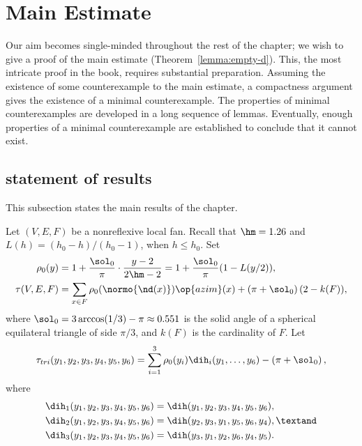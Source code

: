 \section{Main Estimate}\label{sec:weight}  

Our aim becomes single-minded throughout the rest of the chapter; we
wish to give a proof of the main estimate (Theorem~\ref{lemma:empty-d}).
This,  the most intricate proof in the book,  requires substantial
preparation.  Assuming the existence of some counterexample to the main estimate, a
compactness argument gives the existence of a minimal counterexample.
The properties of minimal counterexamples are developed in a long
sequence of lemmas.  Eventually, enough properties of a minimal
counterexample are established to conclude that it cannot exist.

\subsection{statement of results}\label{sec:statement}

This subsection states the main results of the chapter.


\begin{definition}\label{def:tau}
Let $(V,E,F)$ be a nonreflexive local fan.  Recall that $\hm = 1.26$ and
$L(h) = ({h_0-h})/({h_0-1})$, when $h \le h_0$.
  Set
\begin{align*}
\rho_0(y) &= 1 + \dfrac{\sol_0}{\pi} \cdot
    \dfrac{y-2}{2\hm-2} = 1 + \dfrac{\sol_0}{\pi}(1 - L(y/2)),\\
  \tau(V,E,F) &=\sum_{x\in F} \rho_0(\normo{\nd(x)})\op{azim}(x)
+ \left(\pi+{\sol_0}\right) (2- k(F)),
\end{align*}
where $\sol_0=3\arccos(1/3)-\pi\approx0.551$ is the solid angle of a
spherical equilateral triangle of side $\pi/3$, and $k(F)$ is the
cardinality of $F$.  
Let 
\begin{equation}\label{eqn:tautri}
  \tau_{tri}(y_1,y_2,y_3,y_4,y_5,y_6) =
  \sum_{i=1}^3 \rho_0(y_i) \dih_i(y_1,\ldots,y_6)
- \left(\pi+{\sol_0}\right),
\end{equation}
where
\begin{align}\label{eqn:dihi}
\dih_1(y_1,y_2,y_3,y_4,y_5,y_6) &= \dih(y_1,y_2,y_3,y_4,y_5,y_6),\notag\\
\dih_2(y_1,y_2,y_3,y_4,y_5,y_6) &= \dih(y_2,y_3,y_1,y_5,y_6,y_4),\textand\notag \\
\dih_3(y_1,y_2,y_3,y_4,y_5,y_6) &= \dih(y_3,y_1,y_2,y_6,y_4,y_5).
\end{align}
%
%
%
%
%
%
%
\end{definition}


